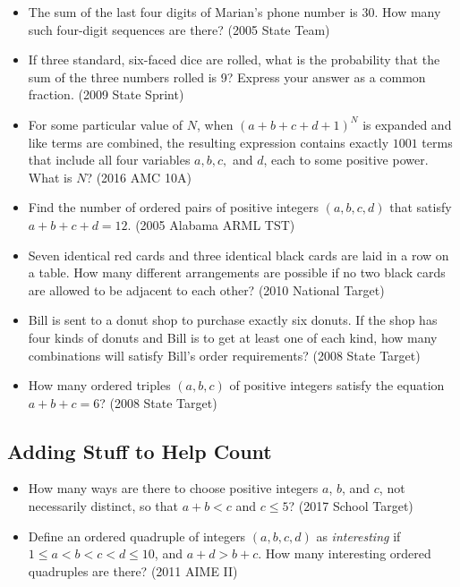 \documentclass{article}
\begin{document}
\begin{itemize}
\item The sum of the last four digits of Marian's phone number is 30. How many such four-digit sequences are there? (2005 State Team)


\item If three standard, six-faced dice are rolled, what is the probability that the sum of the three numbers rolled is 9? Express your answer as a common fraction. (2009 State Sprint)

\item For some particular value of $N$, when $(a+b+c+d+1)^N$ is expanded and like terms are combined, the resulting expression contains exactly $1001$ terms that include all four variables $a, b,c,$ and $d$, each to some positive power. What is $N$? (2016 AMC 10A)


\item Find the number of ordered pairs of positive integers $(a,b,c,d)$ that satisfy $a+b+c+d=12$. (2005 Alabama ARML TST)

\item Seven identical red cards and three identical black cards are laid in a row on a table. How many different arrangements are possible if no two black cards are allowed to be adjacent to each other? (2010 National Target)

\item Bill is sent to a donut shop to purchase exactly six donuts. If the shop has four kinds of donuts and Bill is to get at least one of each kind, how many combinations will satisfy Bill's order requirements? (2008 State Target)

\item How many ordered triples $(a,b,c)$ of positive integers satisfy the equation $a+b+c=6$? (2008 State Target)

\end{itemize}


\subsection{Adding Stuff to Help Count}

\begin{itemize}

\item How many ways are there to choose positive integers $a$, $b$, and $c$, not necessarily distinct, so that $a+b<c$ and $c\le 5$? (2017 School Target)


\item Define an ordered quadruple of integers $(a,b,c,d)$ as \emph{interesting} if $1\le a<b<c<d\le 10$, and $a+d>b+c$. How many interesting ordered quadruples are there? (2011 AIME II)

\end{itemize}
\end{document}
